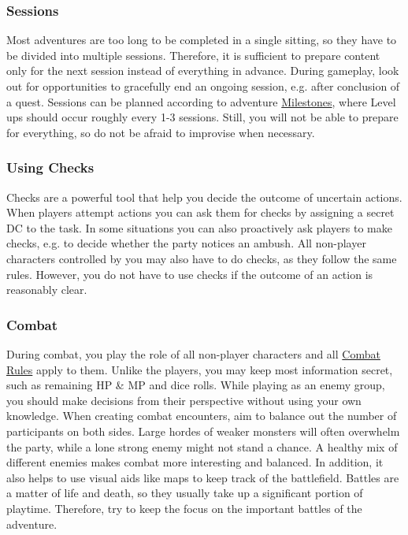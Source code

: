 \subsubsection*{Sessions}
Most adventures are too long to be completed in a single sitting, so they have to be divided into multiple sessions.
Therefore, it is sufficient to prepare content only for the next session instead of everything in advance.
During gameplay, look out for opportunities to gracefully end an ongoing session, e.g. after conclusion of a quest.
Sessions can be planned according to adventure \hyperlink{ms}{Milestones}, where Level ups should occur roughly every 1-3 sessions.
Still, you will not be able to prepare for everything, so do not be afraid to improvise when necessary.

\pagebreak

\subsubsection*{Using Checks}
Checks are a powerful tool that help you decide the outcome of uncertain actions.
When players attempt actions you can ask them for checks by assigning a secret DC to the task.
In some situations you can also proactively ask players to make checks, e.g. to decide whether the party notices an ambush.
All non-player characters controlled by you may also have to do checks, as they follow the same rules.
However, you do not have to use checks if the outcome of an action is reasonably clear.  

\subsubsection*{Combat}
During combat, you play the role of all non-player characters and all \hyperlink{combat}{Combat Rules} apply to them. 
Unlike the players, you may keep most information secret, such as remaining HP \& MP and dice rolls.
While playing as an enemy group, you should make decisions from their perspective without using your own knowledge.
When creating combat encounters, aim to balance out the number of participants on both sides.
Large hordes of weaker monsters will often overwhelm the party, while a lone strong enemy might not stand a chance.
A healthy mix of different enemies makes combat more interesting and balanced.
In addition, it also helps to use visual aids like maps to keep track of the battlefield.
Battles are a matter of life and death, so they usually take up a significant portion of playtime.
Therefore, try to keep the focus on the important battles of the adventure.   

